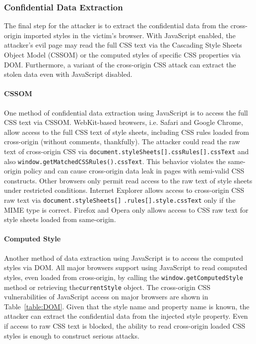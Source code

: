 \documentclass{acm_proc_article-sp}
\begin{document}
\subsubsection{Confidential Data Extraction}\label{sec:extraction}
The final step for the attacker is to extract the confidential data from the cross-origin imported styles in the victim's browser. With JavaScript enabled, the attacker's evil page may read the full CSS text via the Cascading Style Sheets Object Model (CSSOM) or the computed styles of specific CSS properties via DOM. Furthermore, a variant of the cross-origin CSS attack can extract the stolen data even with JavaScript disabled. 

\paragraph{CSSOM}
One method of confidential data extraction using JavaScript is to access the full CSS text via CSSOM. WebKit-based browsers, i.e. Safari and Google Chrome, allow access to the full CSS text of style sheets, including CSS rules loaded from cross-origin (without comments, thankfully). The attacker could read the raw text of cross-origin CSS via \texttt{document.styleSheets[]}\texttt{.cssRules[]}\texttt{.cssText} and also \texttt{window.getMatchedCSSRules().cssText}. This behavior violates the same-origin policy and can cause cross-origin data leak in pages with semi-valid CSS constructs. Other browsers only permit read access to the raw text of style sheets under restricted conditions. Internet Explorer allows access to cross-origin CSS raw text via \texttt{document.styleSheets[]} \texttt{.rules[]}\texttt{.style}\texttt{.cssText} only if the MIME type is correct. Firefox and Opera only allows access to CSS raw text for style sheets loaded from same-origin.

\paragraph{Computed Style}
Another method of data extraction using JavaScript is to access the computed styles via DOM. All major browsers support using JavaScript to read computed styles, even loaded from cross-origin, by calling the \texttt{window.getComputedStyle} method or retrieving the\linebreak \texttt{currentStyle} object. The cross-origin CSS vulnerabilities of JavaScript access on major browsers are shown in Table~\ref{table:DOM}. Given that the style name and property name is known, the attacker can extract the confidential data from the injected style property. Even if access to raw CSS text is blocked, the ability to read cross-origin loaded CSS styles is enough to construct serious attacks.
\end{document}
